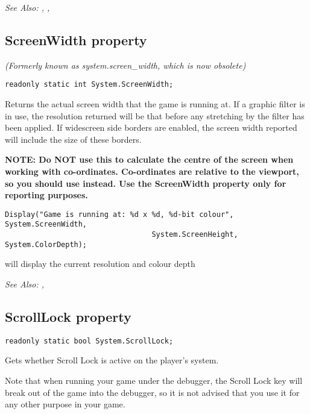 \it{See Also:} ,
,


\subsection{ScreenWidth property}\label{System.ScreenWidth}%

\it{(Formerly known as system.screen_width, which is now obsolete)}

\begin{verbatim}
readonly static int System.ScreenWidth;
\end{verbatim}
Returns the actual screen width that the game is running at.  If a graphic filter is in
use, the resolution returned will be that before any stretching by the filter has been
applied. If widescreen side borders are enabled, the screen width reported will include
the size of these borders.

\bf{NOTE:} Do \bf{NOT} use this to calculate the centre of the screen when working
with co-ordinates. Co-ordinates are relative to the viewport, so you should
use  instead. Use the ScreenWidth
property only for reporting purposes.

\begin{verbatim}
Display("Game is running at: %d x %d, %d-bit colour", System.ScreenWidth,
                                  System.ScreenHeight, System.ColorDepth);
\end{verbatim}
will display the current resolution and colour depth

\it{See Also:} ,


\subsection{ScrollLock property}\label{System.ScrollLock}%

\begin{verbatim}
readonly static bool System.ScrollLock;
\end{verbatim}
Gets whether Scroll Lock is active on the player's system.

Note that when running your game under the debugger, the Scroll Lock key will break
out of the game into the debugger, so it is not advised that you use it for any
other purpose in your game.

